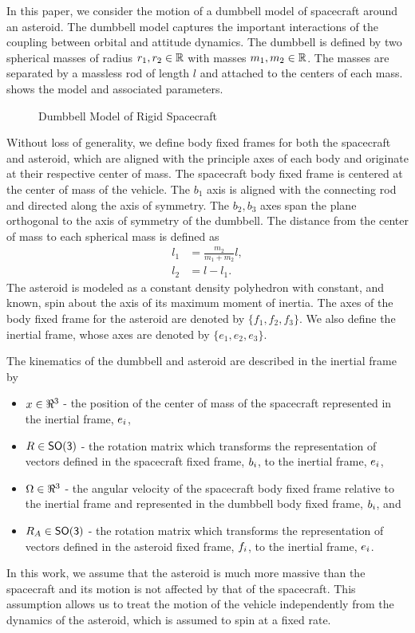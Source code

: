 \documentclass[journal]{new-aiaa}
\begin{document}
In this paper, we consider the motion of a dumbbell model of spacecraft around an asteroid.
The dumbbell model captures the important interactions of the coupling between orbital and attitude dynamics.
The dumbbell is defined by two spherical masses of radius \( r_1, r_2 \in \mathbb{R} \) with masses \( m_1, m_2 \in  \mathbb{R}\).
The masses are separated by a massless rod of length \( l \) and attached to the centers of each mass.
 shows the model and associated parameters.
\begin{figure}[htbp]
    \centering
    
    \caption{Dumbbell Model of Rigid Spacecraft\label{fig:dumbbell_sc}}
\end{figure}
Without loss of generality, we define body fixed frames for both the spacecraft and asteroid, which are aligned with the principle axes of each body and originate at their respective center of mass. 
The spacecraft body fixed frame is centered at the center of mass of the vehicle.
The \( b_1 \)  axis is aligned with the connecting rod and directed along the axis of symmetry.
The \( b_2, b_3 \) axes span the plane orthogonal to the axis of symmetry of the dumbbell.
The distance from the center of mass to each spherical mass is defined as
\begin{align}\label{eq:dumbbell_mass_distances}
    l_1 &= \frac{m_2}{m_1 + m_2} l, \\
    l_2 &= l - l_1.
\end{align}
The asteroid is modeled as a constant density polyhedron with constant, and known, spin about the axis of its maximum moment of inertia. 
The axes of the body fixed frame for the asteroid are denoted by $\{f_1,f_2,f_3\}$. 
We also define the inertial frame, whose axes are denoted by $\{e_1,e_2,e_3\}$. 

The kinematics of the dumbbell and asteroid are described in the inertial frame by
\begin{itemize}
    \item \( x\in\Re^3 \) - the position of the center of mass of the  spacecraft represented in the inertial frame, \( e_i\),
    \item \( R\in\mathsf{SO(3)} \) - the rotation matrix which transforms the representation of vectors defined in the spacecraft fixed frame, \( b_i \), to the inertial frame, \( e_i \),
    \item \( \Omega\in\Re^3 \) - the angular velocity of the spacecraft body fixed frame relative to the inertial frame and represented in the dumbbell body fixed frame, \( b_i \), and
    \item \( R_A\in \mathsf{SO(3)} \) - the rotation matrix which transforms the representation of vectors defined in the asteroid fixed frame, \( f_i \), to the inertial frame, \( e_i \).
\end{itemize}
In this work, we assume that the asteroid is much more massive than the spacecraft and its motion is not affected by that of the spacecraft.
This assumption allows us to treat the motion of the vehicle independently from the dynamics of the asteroid, which is assumed to spin at a fixed rate.  
\end{document}
